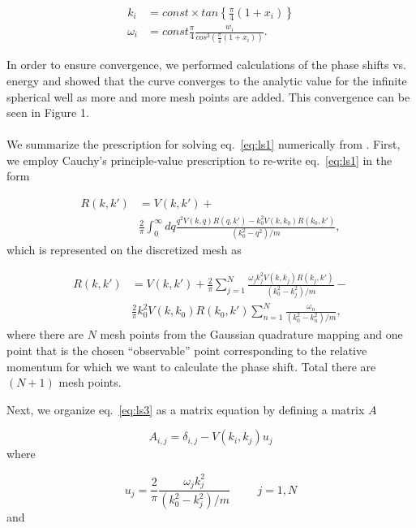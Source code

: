 \documentclass[10pt,showpacs,preprintnumbers,footinbib,amsmath,amssymb,aps,prl,twocolumn,groupedaddress,superscriptaddress,showkeys]{revtex4-1}
\begin{document}
\begin{align*}
          k_i&=const\times tan\left\{\frac{\pi}{4}(1+x_i)\right\} \\
          \omega_i&= const\frac{\pi}{4}\frac{w_i}{cos^2\left(\frac{\pi}{4}(1+x_i)\right)}.
\end{align*}

In order to ensure convergence, we performed calculations of the phase shifts vs. energy and showed that the curve converges to the analytic value for the infinite spherical well as more and more mesh points are added. This convergence can be seen in Figure 1. \\ \\

We summarize the prescription for solving eq.~\ref{eq:ls1} numerically from
\citet{lectureNotes}. First, we employ Cauchy's principle-value prescription
to re-write eq.~\ref{eq:ls1} in the form

\begin{equation}
\begin{split}
    R(k,k') &= V(k,k') + \\
   & \frac{2}{\pi}
                \int_0^{\infty}dq
                \frac{q^2V(k,q)R(q,k')-k_0^2V(k,k_0)R(k_0,k')  }
                     {(k_0^2-q^2)/m},
   \label{eq:ls2}
\end{split}
\end{equation}
which is represented on the discretized mesh as

\begin{equation}
\begin{split}
R(k,k') &= V(k,k') +\frac{2}{\pi}\sum_{j=1}^N\frac{\omega_jk_j^2V(k,k_j)R(k_j,k')}{(k_0^2-k_j^2)/m}- \\
  & \frac{2}{\pi}k_0^2V(k,k_0)R(k_0,k')\sum_{n=1}^N\frac{\omega_n}{(k_0^2-k_n^2)/m},
\end{split}
\label{eq:ls3}
\end{equation}
where there are $N$ mesh points from the Gaussian quadrature mapping
and one point that is the chosen ``observable'' point corresponding to the
relative momentum for which we want to calculate the phase shift. Total
there are $(N+1)$ mesh points.

Next, we organize eq.~\ref{eq:ls3} as a matrix equation by defining a
matrix $A$

\begin{equation*}
	A_{i,j} = \delta _{i,j} - V(k_i,k_j)u_j
\end{equation*}
where

\begin{equation}
     u_j=\frac{2}{\pi}
         \frac{\omega_jk_j^2}{(k_0^2-k_j^2)/m}\hspace{1cm}
         j=1,N
\label{eq:uj}
\end{equation}
and
\end{document}

